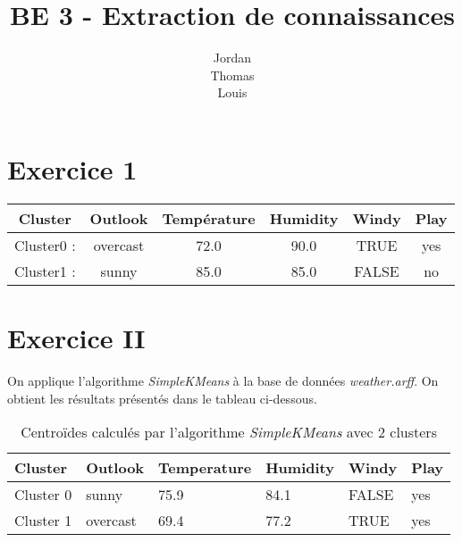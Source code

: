 \documentclass[a4paper, 11pt]{report}
\begin{document}
        \title{BE 3 - Extraction de connaissances}
        \author{Jordan \\ Thomas \\ Louis }

        \maketitle

	\paragraph{}
		\lipsum[1-3]

\section{Exercice 1}
\begin{table}
	\begin{tabular}{|c|c|c|c|c|c|}
		\hline
		Cluster & Outlook & Température & Humidity & Windy & Play \\
		\hline
		Cluster0 : & overcast & 72.0 & 90.0 & TRUE & yes \\
		\hline
		Cluster1 : & sunny & 85.0 & 85.0 & FALSE & no \\
		\hline
	\end{tabular}
\end{table}
        \section{Exercice II}
        On applique l'algorithme \emph{SimpleKMeans} à la base de données \emph{weather.arff}. On obtient les résultats présentés dans le tableau ci-dessous.
        
        \begin{table}[h!]
        \centering
        \begin{tabular}{| l | l | l | l | l | l |}
        \hline
        Cluster & Outlook & Temperature & Humidity & Windy & Play \\
        \hline
        Cluster 0 & sunny & 75.9 & 84.1 & FALSE & yes \\
        \hline
        Cluster 1 & overcast & 69.4 & 77.2 & TRUE & yes \\
        \hline

        \end{tabular}
        \caption{Centroïdes calculés par l'algorithme \emph{SimpleKMeans} avec 2 clusters}
        \label{tab:exo_2}
        \end{table}
        
\end{document}

